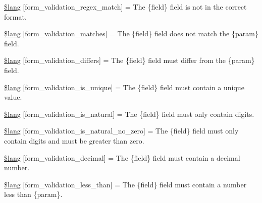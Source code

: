 \begin{DoxyCompactItemize}
\item 
\mbox{\hyperlink{form__validation__lang_8php_a4cc64a1c2fdcf7b8592eb210a6108a9d}{\$lang}} \mbox{[}\textquotesingle{}form\+\_\+validation\+\_\+regex\+\_\+match\textquotesingle{}\mbox{]} = \textquotesingle{}The \{field\} field is not in the correct format.\textquotesingle{}
\item 
\mbox{\hyperlink{form__validation__lang_8php_a843e30483d89e94eb326b34886aeb13d}{\$lang}} \mbox{[}\textquotesingle{}form\+\_\+validation\+\_\+matches\textquotesingle{}\mbox{]} = \textquotesingle{}The \{field\} field does not match the \{param\} field.\textquotesingle{}
\item 
\mbox{\hyperlink{form__validation__lang_8php_a196b3cce6424faf96214ef20e682b2b3}{\$lang}} \mbox{[}\textquotesingle{}form\+\_\+validation\+\_\+differs\textquotesingle{}\mbox{]} = \textquotesingle{}The \{field\} field must differ from the \{param\} field.\textquotesingle{}
\item 
\mbox{\hyperlink{form__validation__lang_8php_a4e16c6146baf3a668fa62bec7cd88398}{\$lang}} \mbox{[}\textquotesingle{}form\+\_\+validation\+\_\+is\+\_\+unique\textquotesingle{}\mbox{]} = \textquotesingle{}The \{field\} field must contain a unique value.\textquotesingle{}
\item 
\mbox{\hyperlink{form__validation__lang_8php_a2c3eddbfb5737ab66d6bc5d5be03ad67}{\$lang}} \mbox{[}\textquotesingle{}form\+\_\+validation\+\_\+is\+\_\+natural\textquotesingle{}\mbox{]} = \textquotesingle{}The \{field\} field must only contain digits.\textquotesingle{}
\item 
\mbox{\hyperlink{form__validation__lang_8php_ae46b693670134065670a56a342f15d3a}{\$lang}} \mbox{[}\textquotesingle{}form\+\_\+validation\+\_\+is\+\_\+natural\+\_\+no\+\_\+zero\textquotesingle{}\mbox{]} = \textquotesingle{}The \{field\} field must only contain digits and must be greater than zero.\textquotesingle{}
\item 
\mbox{\hyperlink{form__validation__lang_8php_a62357354ca5d258d41178ee441391cbc}{\$lang}} \mbox{[}\textquotesingle{}form\+\_\+validation\+\_\+decimal\textquotesingle{}\mbox{]} = \textquotesingle{}The \{field\} field must contain a decimal number.\textquotesingle{}
\item 
\mbox{\hyperlink{form__validation__lang_8php_add53307a4c323f98f2f49db07fb2a0cc}{\$lang}} \mbox{[}\textquotesingle{}form\+\_\+validation\+\_\+less\+\_\+than\textquotesingle{}\mbox{]} = \textquotesingle{}The \{field\} field must contain a number less than \{param\}.\textquotesingle{}
\item 

\end{DoxyCompactItemize}
